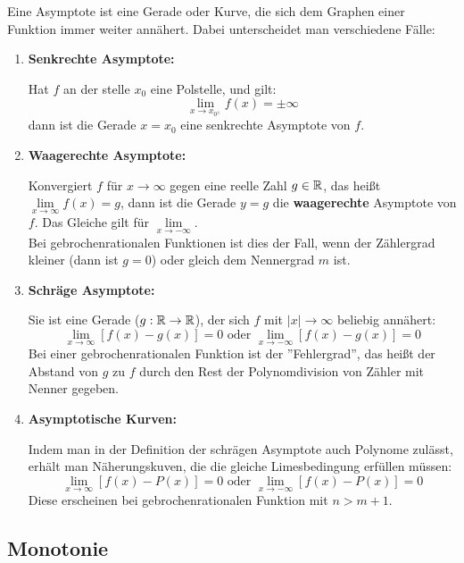 \documentclass[main.tex]{subfiles}
\begin{document}
Eine Asymptote ist eine Gerade oder Kurve, die sich dem Graphen einer Funktion immer weiter annähert. Dabei unterscheidet man verschiedene Fälle:\\
\begin{Definition}
	\begin{enumerate}
		\item \textbf{Senkrechte Asymptote:}
		
		Hat $f$ an der stelle $x_{0}$ eine Polstelle, und gilt:
			$$\lim\limits_{x \rightarrow x_{0^{\pm}}} f(x) = \pm \infty$$
		dann ist die Gerade $x=x_{0}$ eine senkrechte Asymptote von $f$.

		\item \textbf{Waagerechte Asymptote:}
		
		Konvergiert $f$ für $x\rightarrow \infty$ gegen eine reelle Zahl $g\in \mathbb{R}$, das heißt $\lim\limits_{x \rightarrow \infty }{f(x)}=g$, dann ist die Gerade $y=g$ die \textbf{waagerechte} Asymptote von $f$. Das Gleiche gilt für $\lim\limits_{x \rightarrow -\infty}$.\\
		Bei gebrochenrationalen Funktionen ist dies der Fall, wenn der Zählergrad kleiner (dann ist $g=0$) oder gleich dem Nennergrad $m$ ist.

		\item \textbf{Schräge Asymptote:}
		
		Sie ist eine Gerade ($g:\mathbb{R} \rightarrow \mathbb{R}$), der sich $f$ mit $|x|\rightarrow \infty$ beliebig annähert:
		$$\lim\limits_{x \rightarrow \infty}{[f(x)-g(x)]}=0 \text{ oder } \lim\limits_{x \rightarrow -\infty}{[f(x)-g(x)]}=0$$
		Bei einer gebrochenrationalen Funktion ist der ''Fehlergrad'', das heißt der Abstand von $g$ zu $f$ durch den Rest der Polynomdivision von Zähler mit Nenner gegeben.

		\item \textbf{Asymptotische Kurven:}
		
		Indem man in der Definition der schrägen Asymptote auch Polynome zulässt, erhält man Näherungskuven, die die gleiche Limesbedingung erfüllen müssen:
		$$\lim\limits_{x \rightarrow \infty}{[f(x)-P(x)]}=0 \text{ oder } \lim\limits_{x \rightarrow -\infty}{[f(x)-P(x)]}=0$$
		Diese erscheinen bei gebrochenrationalen Funktion mit $n>m+1$.
	\end{enumerate}
\end{Definition}

\subsection{Monotonie}
\end{document}
